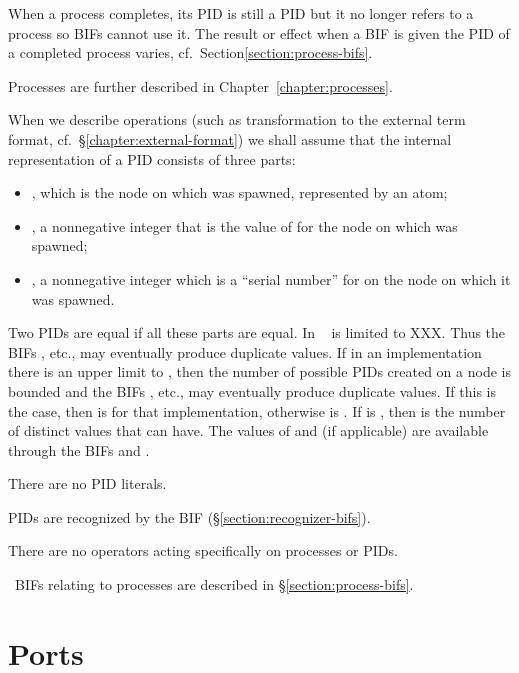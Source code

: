 When a process completes, its PID is still a PID but it no longer
refers to a process so BIFs cannot use it.  The result or effect when
a BIF is given the PID of a completed process varies,
cf.~Section\ref{section:process-bifs}.

Processes are further described in Chapter~\ref{chapter:processes}.

When we describe operations (such as transformation to the external
term format, cf.~\S\ref{chapter:external-format}) we shall assume that
the internal representation of a PID  consists of three parts:
\begin{itemize}
\item {}, which is the node on which  was spawned,
represented by an atom;
\item {}, a nonnegative integer that is the value of
 for the node  on which  was spawned;
\item {}, a nonnegative integer which is a
``serial number'' for  on the node on which it was spawned.
\end{itemize}
Two PIDs are equal if all these parts are equal.
\ifOld
In \OldErlang\  is limited to XXX.  Thus the BIFs , etc.,
may eventually produce duplicate values.
\fi
\ifStd
If in an implementation there is an upper limit to , then
the number of possible PIDs created on a node is bounded and the BIFs
, etc., may eventually produce duplicate values.  If this
is the case, then  is  for that
implementation, otherwise  is .  If
 is , then  is the number of
distinct values that  can have.  The values of
 and  (if applicable) are available
through the BIFs  and .
\fi

There are no PID literals.

PIDs are recognized by the BIF \ifStd{}\else{}\fi
(\S\ref{section:recognizer-bifs}).

There are no operators acting specifically on processes or PIDs.

\Erlang\ BIFs relating to processes are described in \S\ref{section:process-bifs}.

\section{Ports}

